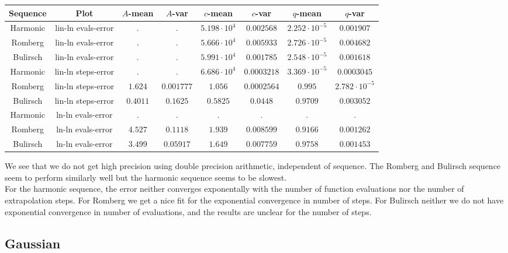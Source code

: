 \begin{table}[H]
    \centering
    \small
    \begin{tabular}{c|c||c|c|c|c|c	|c}
Sequence & Plot & \(A\)-mean & \(A\)-var & \(c\)-mean & \(c\)-var & \(q\)-mean & \(q\)-var\\\hline
Harmonic & lin-ln evals-error & \(.\) & \(.\) & \(5.198\cdot 10^4\) & \(0.002568\) & \(2.252\cdot 10^{-5}\) & \(0.001907\) \\
Romberg & lin-ln evals-error & \(.\) & \(.\) & \(5.666\cdot 10^4\) & \(0.005933\) & \(2.726\cdot 10^{-5}\) & \(0.004682\) \\
Bulirsch & lin-ln evals-error & \(.\) & \(.\) & \(5.991\cdot 10^4\) & \(0.001785\) & \(2.548\cdot 10^{-5}\) & \(0.001618\) \\
Harmonic & lin-ln steps-error & \(.\) & \(.\) & \(6.686\cdot 10^4\) & \(0.0003218\) & \(3.369\cdot 10^{-5}\) & \(0.0003045\) \\
Romberg & lin-ln steps-error & \(1.624\) & \(0.001777\) & \(1.056\) & \(0.0002564\) & \(0.995\) & \(2.782\cdot 10^{-5}\) \\
Bulirsch & lin-ln steps-error & \(0.4011\) & \(0.1625\) & \(0.5825\) & \(0.0448\) & \(0.9709\) & \(0.003052\) \\
Harmonic & ln-ln evals-error & . & . & . & . & . & . \\
Romberg & ln-ln evals-error & \(4.527\) & \(0.1118\) & \(1.939\) & \(0.008599\) & \(0.9166\) & \(0.001262\) \\
Bulirsch & ln-ln evals-error & \(3.499\) & \(0.05917\) & \(1.649\) & \(0.007759\) & \(0.9758\) & \(0.001453\) \\
    \end{tabular}
    \label{tab:my_label}
\end{table}

We see that we do not get high precision using double precision arithmetic, independent of sequence. The Romberg and Bulirsch sequence seem to perform similarly well but the harmonic sequence seems to be slowest.\\

For the harmonic sequence, the error neither converges exponentally with the number of function evaluations nor the number of extrapolation steps. For Romberg we get a nice fit for the exponential convergence in number of steps. For Bulirsch neither we do not have exponential convergence in number of evaluations, and the results are unclear for the number of steps.

\subsection{Gaussian}

